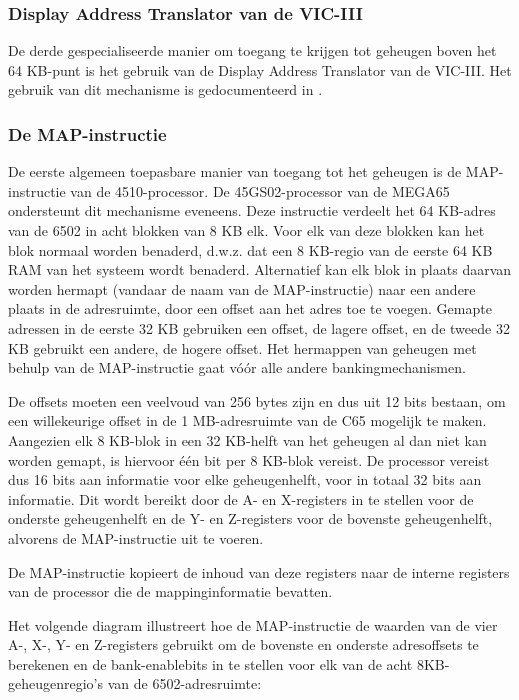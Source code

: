 \subsubsection{Display Address Translator van de VIC-III}

De derde gespecialiseerde manier om toegang te krijgen tot geheugen boven het 64 KB-punt is het gebruik van de Display Address Translator van de VIC-III. Het gebruik van dit mechanisme is gedocumenteerd in .

\subsubsection{De MAP-instructie}
\label{sec:map-instruction}

De eerste algemeen toepasbare manier van toegang tot het geheugen is de MAP-instructie van de 4510-processor. De 45GS02-processor van de MEGA65 ondersteunt dit mechanisme eveneens. Deze instructie verdeelt het 64 KB-adres van de 6502 in acht blokken van 8 KB elk. Voor elk van deze blokken kan het blok normaal worden benaderd, d.w.z. dat een 8 KB-regio van de eerste 64 KB RAM van het systeem wordt benaderd. Alternatief kan elk blok in plaats daarvan worden hermapt (vandaar de naam van de MAP-instructie) naar een andere plaats in de adresruimte, door een offset aan het adres toe te voegen. Gemapte adressen in de eerste 32 KB gebruiken een offset, de lagere offset, en de tweede 32 KB gebruikt een andere, de hogere offset. Het hermappen van geheugen met behulp van de MAP-instructie gaat vóór alle andere bankingmechanismen.

De offsets moeten een veelvoud van 256 bytes zijn en dus uit 12 bits bestaan, om een willekeurige offset in de 1 MB-adresruimte van de C65 mogelijk te maken. Aangezien elk 8 KB-blok in een 32 KB-helft van het geheugen al dan niet kan worden gemapt, is hiervoor één bit per 8 KB-blok vereist. De processor vereist dus 16 bits aan informatie voor elke geheugenhelft, voor in totaal 32 bits aan informatie. Dit wordt bereikt door de A- en X-registers in te stellen voor de onderste geheugenhelft en de Y- en Z-registers voor de bovenste geheugenhelft, alvorens de MAP-instructie uit te voeren.

De MAP-instructie kopieert de inhoud van deze registers naar de interne registers van de processor die de mappinginformatie bevatten.

Het volgende diagram illustreert hoe de MAP-instructie de waarden van de vier A-, X-, Y- en Z-registers gebruikt om de bovenste en onderste adresoffsets te berekenen en de bank-enablebits in te stellen voor elk van de acht 8KB-geheugenregio's van de 6502-adresruimte:

